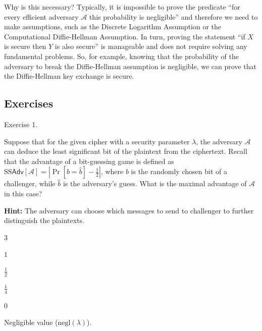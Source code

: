 \documentclass[../lecture-notes-148x210.tex]{subfiles}
\begin{document}
\vspace{10pt}

Why is this necessary? Typically, it is impossible to prove the predicate ``for every efficient adversary $\mathcal{A}$ this probability is negligible'' and therefore we need to make assumptions, such as the Discrete Logarithm Assumption or the Computational Diffie-Hellman Assumption. In turn, proving the statement ``if $X$ is secure then $Y$ is also secure'' is manageable and does not require solving any fundamental problems. So, for example,
knowing that the probability of the adversary to break the Diffie-Hellman assumption is negligible, we can prove that the Diffie-Hellman key exchange is secure. 

\subsection{Exercises}

\begin{xexercise}
    {Exercise 1.}
    {
        Suppose that for the given cipher with a security parameter $\lambda$, the adversary $\mathcal{A}$ can 
        deduce the least significant bit of the plaintext from the ciphertext. Recall that the advantage of a 
        bit-guessing game is defined as $\text{SS}\mathsf{Adv}[\mathcal{A}] = \left|\Pr[b=\hat{b}] - \frac{1}{2}\right|$, 
        where $b$ is the randomly chosen bit of a challenger, while $\hat{b}$ is the adversary's guess. What is the 
        maximal advantage of $\mathcal{A}$ in this case?

        \textbf{Hint:} The adversary can choose which messages to send to challenger to further distinguish the plaintexts.
    }
    {3}
    {
        \item $1$
        \item $\frac{1}{2}$
        \item $\frac{1}{4}$
        \item $0$
        \item Negligible value ($\text{negl}(\lambda)$).
    }
\end{xexercise}
\end{document}
